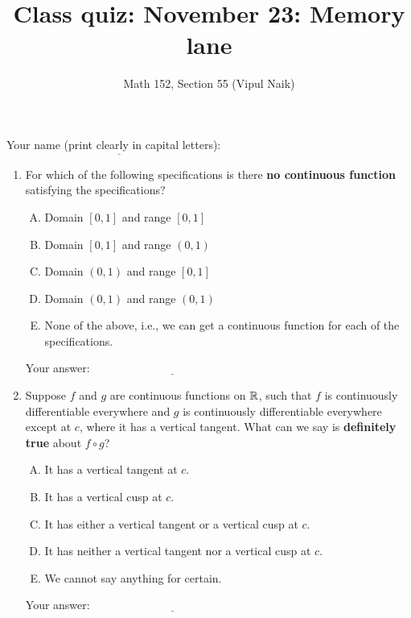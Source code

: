 \documentclass[10pt]{amsart}
\title{Class quiz: November 23: Memory lane}
\author{Math 152, Section 55 (Vipul Naik)}
\begin{document}
\maketitle

Your name (print clearly in capital letters): $\underline{\qquad\qquad\qquad\qquad\qquad\qquad\qquad\qquad\qquad\qquad}$

\begin{enumerate}
\item For which of the following specifications is there {\bf no
  continuous function} satisfying the specifications?

  \begin{enumerate}[(A)]
  \item Domain $[0,1]$ and range $[0,1]$
  \item Domain $[0,1]$ and range $(0,1)$
  \item Domain $(0,1)$ and range $[0,1]$
  \item Domain $(0,1)$ and range $(0,1)$
  \item None of the above, i.e., we can get a continuous function for
    each of the specifications.
  \end{enumerate}

  \vspace{0.1in}
  Your answer: $\underline{\qquad\qquad\qquad\qquad\qquad\qquad\qquad}$
  \vspace{0.6in}

\item Suppose $f$ and $g$ are continuous functions on $\mathbb{R}$, such that
  $f$ is continuously differentiable everywhere and $g$ is
  continuously differentiable everywhere except at $c$, where it has a
  vertical tangent. What can we say is {\bf definitely true} about $f
  \circ g$?

  \begin{enumerate}[(A)]
  \item It has a vertical tangent at $c$.
  \item It has a vertical cusp at $c$.
  \item It has either a vertical tangent or a vertical cusp at $c$.
  \item It has neither a vertical tangent nor a vertical cusp at $c$.
  \item We cannot say anything for certain.
  \end{enumerate}

  \vspace{0.1in}
  Your answer: $\underline{\qquad\qquad\qquad\qquad\qquad\qquad\qquad}$
  \vspace{0.6in}


\end{enumerate}
\end{document}
